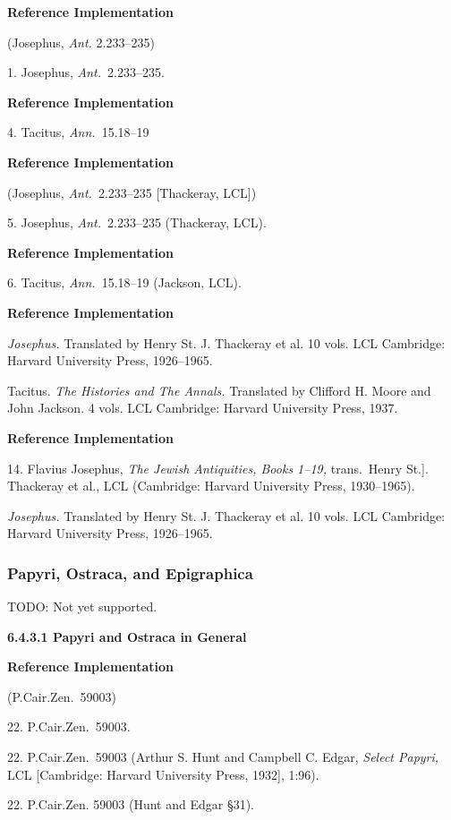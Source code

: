 \documentclass[a4paper]{article}
\newenvironment{refimp}{%
  \begin{minipage}{\linewidth}
    \setlength{\parskip}{1ex}
    \textbf{Reference Implementation}\par
    \nobreak
    \color{reference-colour}
}{\end{minipage}}
\begin{document}
\begin{refimp}
  (Josephus, \emph{Ant.} 2.233–235)

  1. Josephus, \emph{Ant.}\ 2.233–235.
\end{refimp}

\begin{refimp}
  4. Tacitus, \emph{Ann.}\ 15.18–19
\end{refimp}

\begin{refimp}
  (Josephus, \emph{Ant.}\ 2.233–235 [Thackeray, LCL])

  5. Josephus, \emph{Ant.}\ 2.233–235 (Thackeray, LCL).
\end{refimp}

\begin{refimp}
  6. Tacitus, \emph{Ann.}\ 15.18–19 (Jackson, LCL).
\end{refimp}

\begin{refimp}
  \hangindent\bibindent \emph{Josephus.} Translated by Henry St. J. Thackeray
  et al. 10 vols. LCL Cambridge: Harvard University Press, 1926–1965.

  \hangindent\bibindent Tacitus. \emph{The Histories and The Annals.}
  Translated by Clifford H. Moore and John Jackson. 4 vols. LCL Cambridge:
  Harvard University Press, 1937.
\end{refimp}

\begin{refimp}
  14. Flavius Josephus, \emph{The Jewish Antiquities, Books 1–19,} trans.\
  Henry St.]. Thackeray et al., LCL (Cambridge: Harvard University Press,
  1930–1965).

  \hangindent\bibindent \emph{Josephus.} Translated by Henry St. J. Thackeray
  et al. 10 vols. LCL Cambridge: Harvard University Press, 1926–1965.
\end{refimp}

\subsubsection{Papyri, Ostraca, and Epigraphica}

TODO: Not yet supported.

\textbf{6.4.3.1 Papyri and Ostraca in General}

\begin{refimp}
  (P.Cair.Zen.\ 59003)

  22. P.Cair.Zen.\ 59003.

  22. P.Cair.Zen.\ 59003 (Arthur S. Hunt and Campbell C. Edgar, \emph{Select
  Papyri,} LCL [Cambridge: Harvard University Press, 1932], 1:96).

  22. P.Cair.Zen. 59003 (Hunt and Edgar §31).
\end{refimp}
\end{document}
